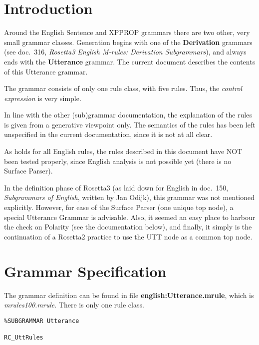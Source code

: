 
   \RosSupersedes{-}
   \MakeRosTitle
%
%

\section{Introduction}
Around the English Sentence and XPPROP grammars there are two other, very 
small grammar
classes. Generation begins with one of the {\bf Derivation} grammars (see doc.\ 
316, {\em Rosetta3 English M-rules: Derivation Subgrammars\/}), and always ends
with the {\bf Utterance} grammar.
The current document describes the contents of this Utterance grammar.

The grammar consists of only one rule class, with five rules.
Thus, the {\em control expression} is very simple.

In line with the other (sub)grammar documentation, the 
explanation of the rules is given from a generative viewpoint
only. The semantics of the rules 
has been left unspecified in the current documentation, since it is not at all 
clear.

As holds for all English rules, the rules described in this document have NOT 
been tested 
properly, since English analysis is not possible yet (there is no Surface 
Parser).

In the definition phase of Rosetta3 (as laid down for English in doc.\ 
150, {\em Subgrammars of English\/}, written by Jan Odijk), 
this grammar was not mentioned explicitly. However, for ease of the Surface 
Parser (one unique top node), a special Utterance Grammar is advisable.
Also, it seemed an easy place to harbour the check on Polarity (see the 
documentation below), and finally, it simply is the continuation of a Rosetta2 
practice to use the UTT node as a common top node.


\newpage
\section{Grammar Specification}
The grammar definition can be found in file {\bf english:Utterance.mrule}, 
which is {\em mrules100.mrule\/}. There is only one rule class.

\begin{verbatim}
%SUBGRAMMAR Utterance

RC_UttRules

\end{verbatim}

